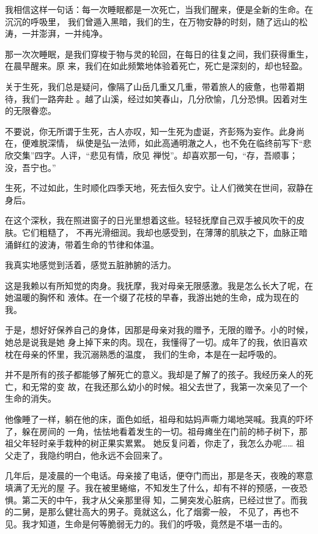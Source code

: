 \documentclass[12pt,a4paper]{article}
\begin{document}

		我相信这样一句话：每一次睡眠都是一次死亡，当我们醒来，便是全新的生命。在沉沉的呼吸里，
	我们曾遁入黑暗，我们的生，在万物安静的时刻，随了远山的松涛，一并澎湃，一并纯净。

		那一次次睡眠，是我们穿梭于物与灵的轮回，在每日的往复之间，我们获得重生，在晨早醒来。原
	来，我们在如此频繁地体验着死亡，死亡是深刻的，却也轻盈。

		关于生死，我们总是疑问，像隔了山岳几重又几重，带着旅人的疲惫，也带着期待，我们一路奔赴
	。越了山溪，经过如笑春山，几分欣愉，几分恐惧。因着对生的无限眷恋。

		不要说，你无所谓于生死，古人亦叹，知一生死为虚诞，齐彭殇为妄作。此身尚在，便难脱深情，
	纵使是弘一法师，如此高通明澈之人，也不免在临终前写下“悲欣交集”四字。人评，“悲见有情，欣见
	禅悦”。却喜欢那一句，“存，吾顺事；没，吾宁也。”

		生死，不过如此，生时顺化四季天地，死去恒久安宁。让人们微笑在世间，寂静在身后。

		在这个深秋，我在照进窗子的日光里想着这些。轻轻抚摩自己双手被风吹干的皮肤。它们粗糙了，
	不再光滑细润。我却也感受到，在薄薄的肌肤之下，血脉正暗涌鲜红的波涛，带着生命的节律和体温。

		我真实地感觉到活着，感觉五脏肺腑的活力。

		这是我赖以有所知觉的肉身。我抚摩，我对母亲无限感激。我是怎么长大了呢，在她温暖的胸怀和
	液体。在一个缀了花枝的早春，我游出她的生命，成为现在的我。

		于是，想好好保养自己的身体，因那是母亲对我的赠予，无限的赠予。小的时候，她总是说我是她
	身上掉下来的肉。现在，我懂得了一切。成年了的我，依旧喜欢枕在母亲的怀里，我沉溺熟悉的温度，
	我们的生命，本是在一起呼吸的。

		并不是所有的孩子都能够了解死亡的意义。我却是了解了的孩子。我经历亲人的死亡，和无常的变
	故，在我还那么幼小的时候。祖父去世了，我第一次亲见了一个生命的消失。

		他像睡了一样，躺在他的床，面色如纸，祖母和姑妈声嘶力竭地哭喊。我真的吓坏了，躲在房间的
	一角，怯怯地看着发生的一切。祖母瘫坐在门前的柿子树下，那祖父年轻时亲手栽种的树正果实累累。
	她反复问着，你走了，我怎么办呢…… 祖父走了，我隐约明白，他永远不会回来了。

		几年后，是凌晨的一个电话。母亲接了电话，便夺门而出，那是冬天，夜晚的寒意填满了无光的屋
	子。我在被里蜷缩，不知发生了什么，却有不祥的预感，一夜恐惧。第二天的中午，我才从父亲那里得
	知，二舅突发心脏病，已经过世了。而我的二舅，是那么健壮高大的男子。竟就这么，化了烟雾一般，
	不见了，再也不见。我才知道，生命是何等脆弱无力的。我们的呼吸，竟然是不堪一击的。
\end{document}
